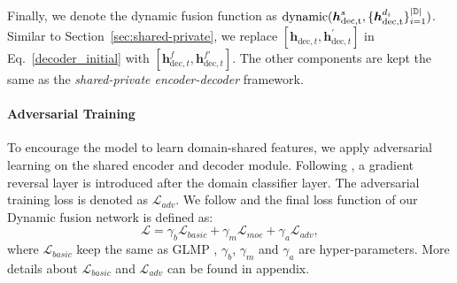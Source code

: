 \documentclass[11pt,a4paper]{article}
\newcommand{\dynfusion}{{\rm{dynamic}}}
\begin{document}
Finally, we denote the dynamic fusion function as $\dynfusion ({\boldsymbol{h}_{\text{dec,t}}^{s}}, \{{\boldsymbol{h}}_\text{dec,t}^{d_{i}}\}_{i=1}^{|\mathbb{D}|})$. Similar to Section~\ref{sec:shared-private}, we replace $[\boldsymbol{h}^{}_{\text{dec},t}, \boldsymbol{h}^{'}_{\text{dec}, t}]$ in Eq.~\ref{decoder_initial} with $[ \boldsymbol{h}_{{\text{dec}, t}}^{f},{\boldsymbol{h}}^{f'}_{\text{dec}, t}]$. The other components are kept the same as the \textit{shared-private encoder-decoder} framework.

\paragraph{Adversarial Training}
To encourage the model to learn domain-shared features, we apply adversarial learning on the shared encoder and decoder module.
Following , a gradient reversal layer \cite{ganin2014unsupervised} is introduced after the domain classifier layer.
The adversarial training loss is denoted as $\mathcal{L}_{adv}$.
 We follow  and the final loss function of our Dynamic fusion network is defined as:
\begin{equation}
\mathcal{L} = \gamma_{b}\mathcal{L}_{basic} + \gamma_{m}\mathcal{L}_{moe} + \gamma_{a}\mathcal{L}_{adv},
\end{equation}
where $\mathcal{L}_{basic}$ keep the same as GLMP \cite{DBLP:conf/iclr/WuSX19}, $\gamma_{b}$, $\gamma_{m}$ and $\gamma_{a}$ are hyper-parameters.
 More details about $\mathcal{L}_{basic}$ and $\mathcal{L}_{adv}$ can be found in appendix.
\begin{table}[t]
	\begin{center}
		
	\end{center}
	\caption{Statistics of datasets.}
	\label{tab:OverallSta}
\end{table}
\end{document}
